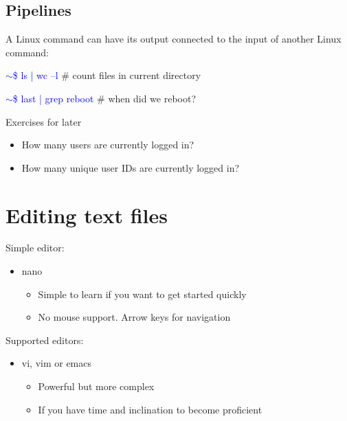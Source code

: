 \documentclass{beamer}[10pt, usepdftitle=false, handout]
\newcommand*{\blue}{\textcolor{blue}}
\begin{document}
	\subsection{Pipelines}	
	
	\begin{frame}
	
	A Linux command can have its output connected to the input of another Linux command:
	\vspace*{1em}
	
	\blue{$\sim$\$ ls | wc –l} \# count files in current directory

	\blue{$\sim$\$ last | grep reboot} \# when did we reboot?
	
	\vspace*{1em}
	\begin{block}{Exercises for later}
	\begin{itemize}
	\item{How many users are currently logged in?}
	\item{How many unique user IDs are currently logged in?}
	\end{itemize}
	\end{block}
	
	\end{frame}	
			
	\section{Editing text files}
		
	\begin{frame}
	
	
	Simple editor:
	\vspace*{1em}
	
	\begin{itemize}
	\item{nano
	\begin{itemize}
	\item{Simple to learn if you want to get started quickly}
	\item{No mouse support. Arrow keys for navigation}
	\end{itemize}
	}
	\end{itemize}
	\vspace*{0.5em}
	
	Supported editors:
	\vspace*{1em}
	
	\begin{itemize}
	\item{vi, vim or emacs
		\begin{itemize}
			\item{Powerful but more complex}
			\item{If you have time and inclination to become proficient}
		\end{itemize}
	}
	\end{itemize}
		
	\end{frame}		
	
\end{document}
